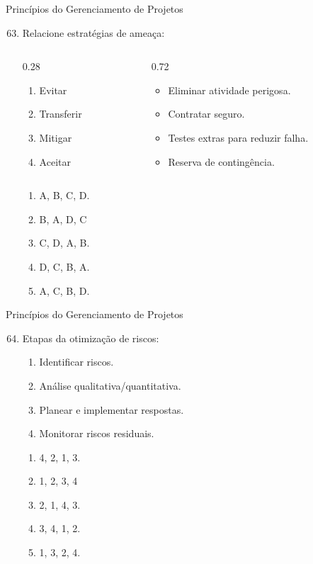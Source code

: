 \documentclass{beamer}
\begin{document}
\begin{frame}{Princípios do Gerenciamento de Projetos}
	\begin{enumerate}
		\setcounter{enumi}{62}
		\justifying
		\item Relacione estratégias de ameaça:
		\begin{columns}
			\begin{column}{0.28\textwidth}
				\begin{enumerate}[A]
					\item Evitar
					\item Transferir
					\item Mitigar
					\item Aceitar
				\end{enumerate}
			\end{column}
			\begin{column}{0.72\textwidth}
				\begin{itemize}
					\item Eliminar atividade perigosa.
					\item Contratar seguro.
					\item Testes extras para reduzir falha.
					\item Reserva de contingência.
				\end{itemize}
			\end{column}
		\end{columns}
		\begin{enumerate}[a]
			\item A, B, C, D.
			\item \alert<2>{B, A, D, C}
			\item C, D, A, B.
			\item D, C, B, A.
			\item A, C, B, D.
		\end{enumerate}
	\end{enumerate}
\end{frame}

\begin{frame}{Princípios do Gerenciamento de Projetos}
	\begin{enumerate}
		\setcounter{enumi}{63}
		\justifying
		\item Etapas da otimização de riscos:
		\begin{enumerate}[I]
			\item Identificar riscos.
			\item Análise qualitativa/quantitativa.
			\item Planear e implementar respostas.
			\item Monitorar riscos residuais.
		\end{enumerate}
		\begin{enumerate}[a]
			\item 4, 2, 1, 3.
			\item \alert<2>{1, 2, 3, 4}
			\item 2, 1, 4, 3.
			\item 3, 4, 1, 2.
			\item 1, 3, 2, 4.
		\end{enumerate}
	\end{enumerate}
\end{frame}
\end{document}
